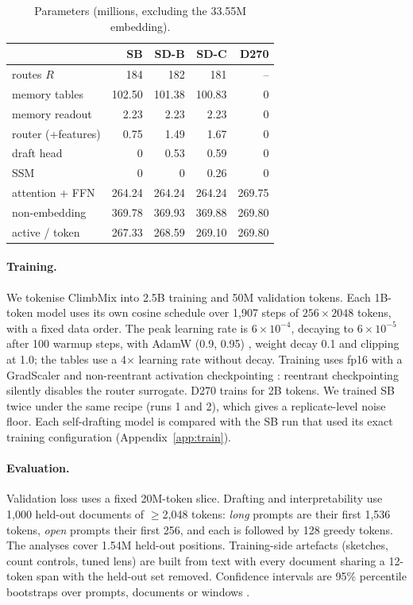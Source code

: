 \documentclass[11pt]{article}
\newcommand{\SB}{\textsc{SB}}
\newcommand{\SDB}{\textsc{SD-B}}
\newcommand{\SDC}{\textsc{SD-C}}
\newcommand{\Dense}{\textsc{D270}}
\begin{document}
\begin{table}[t]
\centering
\small
\setlength{\tabcolsep}{3.5pt}
\begin{tabular}{lrrrr}
\toprule
 & \SB & \SDB & \SDC & \Dense \\
\midrule
routes $R$ & 184 & 182 & 181 & -- \\
memory tables & 102.50 & 101.38 & 100.83 & 0 \\
memory readout & 2.23 & 2.23 & 2.23 & 0 \\
router (+features) & 0.75 & 1.49 & 1.67 & 0 \\
draft head & 0 & 0.53 & 0.59 & 0 \\
SSM & 0 & 0 & 0.26 & 0 \\
attention + FFN & 264.24 & 264.24 & 264.24 & 269.75 \\
\midrule
non-embedding & 369.78 & 369.93 & 369.88 & 269.80 \\
active / token & 267.33 & 268.59 & 269.10 & 269.80 \\
\bottomrule
\end{tabular}
\caption{Parameters (millions, excluding the 33.55M embedding).}
\label{tab:models}
\end{table}

\paragraph{Training.}
We tokenise ClimbMix \citep{diao2025climb} into 2.5B training and 50M validation tokens. Each 1B-token model uses its own
cosine schedule over 1{,}907 steps of $256\times2048$ tokens, with a fixed data order. The peak learning rate is
$6\times10^{-4}$, decaying to $6\times10^{-5}$ after 100 warmup steps, with AdamW (0.9, 0.95) \citep{loshchilov2019adamw}, weight decay 0.1 and
clipping at 1.0; the tables use a 4$\times$ learning rate without decay. Training uses fp16 with a GradScaler
\citep{micikevicius2018mixed} and non-reentrant activation checkpointing \citep{chen2016training}: reentrant
checkpointing silently disables the router surrogate. \Dense{} trains for 2B tokens. We trained \SB{} twice under the same
recipe (runs 1 and 2), which gives a replicate-level noise floor. Each self-drafting model is compared with the \SB{} run
that used its exact training configuration (Appendix~\ref{app:train}).

\paragraph{Evaluation.}
Validation loss uses a fixed 20M-token slice. Drafting and interpretability use 1{,}000 held-out documents of
$\geq$2{,}048 tokens: \emph{long} prompts are their first 1{,}536 tokens, \emph{open} prompts their first 256, and each
is followed by 128 greedy tokens. The analyses cover 1.54M held-out positions. Training-side artefacts (sketches, count
controls, tuned lens) are built from text with every document sharing a 12-token span with the held-out set removed.
Confidence intervals are 95\% percentile bootstraps over prompts, documents or windows \citep{efron1994introduction}.
\end{document}
